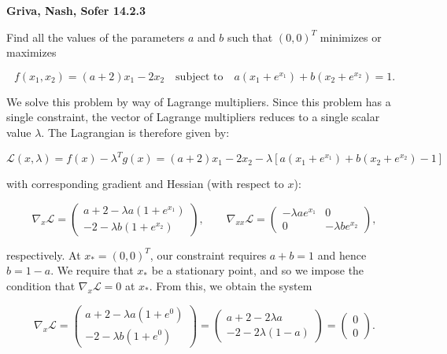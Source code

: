 \textbf{Griva, Nash, Sofer 14.2.3}

Find all the values of the parameters $a$ and $b$ such that $(0, 0)^T$ minimizes or maximizes

$$
f(x_1, x_2) = (a + 2)x_1 - 2x_2
\quad \text{subject to} \quad 
a \left(x_1 + e^{x_1} \right) + b \left(x_2 + e^{x_2} \right) = 1.
$$


\begin{solution}
    We solve this problem by way of Lagrange multipliers. Since this problem has a single constraint, the vector of 
    Lagrange multipliers reduces to a single scalar value $\lambda$. The Lagrangian is therefore given by:

    $$
    \mathcal{L}(x, \lambda) = f(x) - \lambda^T g(x) = (a + 2)x_1 - 2x_2 - \lambda \left[a \left(x_1 + e^{x_1} \right) + b \left(x_2 + e^{x_2} \right) - 1 \right]
    $$

    with corresponding gradient and Hessian (with respect to $x$):

    $$
    \nabla_x \mathcal{L} = \begin{pmatrix*}
        a + 2 - \lambda a \left(1 + e^{x_1} \right) \\
        -2 - \lambda b \left(1 + e^{x_2} \right)
    \end{pmatrix*}, \qquad \nabla_{xx} \mathcal{L} = \begin{pmatrix*}
        -\lambda a e^{x_1} & 0 \\
        0                  & -\lambda b e^{x_2}
    \end{pmatrix*},
    $$

    respectively. At $x_* = (0, 0)^T$, our constraint requires $a + b = 1$ and hence $b = 1 - a$. We require that $x_*$
    be a stationary point, and so we impose the condition that $\nabla_x \mathcal{L} = 0$ at $x_*$. From this, we 
    obtain the system

    $$
    \nabla_x \mathcal{L} = \begin{pmatrix*}
        a + 2 - \lambda a \left(1 + e^{0} \right) \\
        -2 - \lambda b \left(1 + e^{0} \right)
    \end{pmatrix*} = \begin{pmatrix*}
        a + 2 - 2 \lambda a \\
        -2 - 2 \lambda (1 - a)
    \end{pmatrix*} = \begin{pmatrix*}
        0 \\
        0
    \end{pmatrix*}.
    $$


\end{solution}
